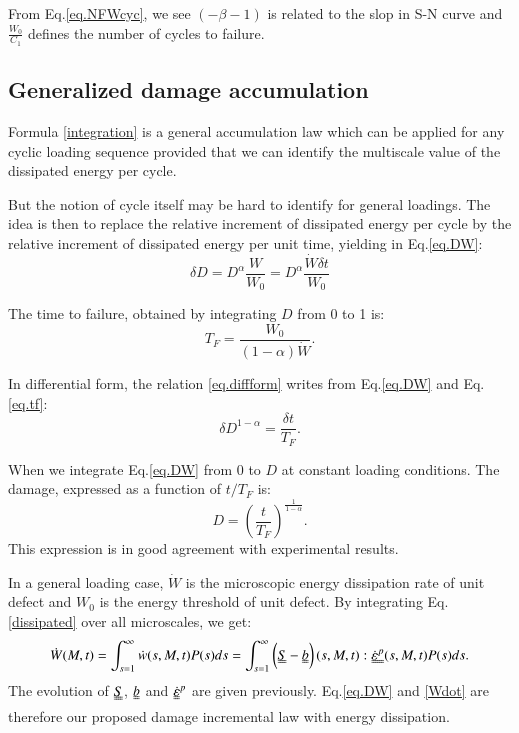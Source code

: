 \documentclass[3p,times,number,review]{elsarticle}
\begin{document}
From Eq.\eqref{eq.NFWcyc}, we see $(-\beta-1)$ is related to the slop in S-N curve and $\frac{W_0}{C_1}$ defines the number of cycles to failure.
 
 
\subsection{Generalized damage accumulation}
Formula \eqref{integration} is a general accumulation law which can be applied for any cyclic loading sequence provided that we can identify the multiscale value of the dissipated energy per cycle. 

But the notion of cycle itself may be hard to identify for general loadings. The idea is then to replace the relative increment of dissipated energy per cycle by the relative increment of dissipated energy per unit time, yielding in Eq.\eqref{eq.DW}:
\begin{equation}
\delta D= D^\alpha \dfrac{W}{W_0} = D^\alpha \dfrac{\dot{W}\delta t}{W_0}
\label{eq.DW}
\end{equation}

The time to failure, obtained by integrating $D$ from 0 to 1 is:
\begin{equation}
T_F=\dfrac{W_0}{\left( 1-\alpha\right) \dot{W}}.
\label{eq.tf}
\end{equation}

In differential form, the relation \eqref{eq.diffform} writes from Eq.\eqref{eq.DW} and Eq.\eqref{eq.tf}:
\begin{equation}
\delta D^{1-\alpha}=\frac{\delta t}{T_F}.
\label{eq.diffform}
\end{equation}

When we integrate Eq.\eqref{eq.DW} from $0$ to $D$ at constant loading conditions. The damage, expressed as a function of $t/T_F$ is:
\begin{equation}
D=\left( \frac{t}{T_F}\right) ^{\frac{1}{1-\alpha}}.
\label{eqD}
\end{equation}
This expression is in good agreement with experimental results\cite{lemaitre1990mechanics}. 

In a general loading case, $\dot{W}$ is the microscopic energy dissipation rate of unit defect and $W_0$ is the energy threshold of unit defect. By integrating Eq.\eqref{dissipated} over all microscales, we get:
\begin{equation}\dot{W}(M,t)=\int_{s=1}^{\infty}\dot{w}(s,M,t)P(s)ds=\int_{s=1}^{\infty}\left(\uuline{S}-\uuline{b} \right) (s,M,t):\uuline{\dot{\varepsilon}^p}(s,M,t)P(s)ds.\label{Wdot}
\end{equation}
The evolution of $\uuline{S}$, $\uuline{b}$ and $\uuline{\dot{\varepsilon}}^p$ are given previously. Eq.\eqref{eq.DW} and \eqref{Wdot} are therefore our proposed damage incremental law with energy dissipation.
\end{document}
